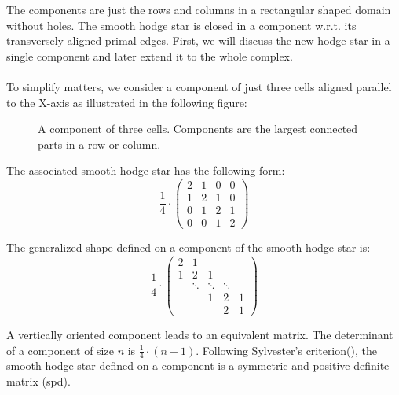 The components are just the rows and columns in a rectangular shaped domain without holes.
The smooth hodge star is closed in a component w.r.t. its transversely aligned primal edges.
First, we will discuss the new hodge star in a single component and later extend it to the whole complex.

\paragraph*{}
To simplify matters, we consider a component of just three cells aligned parallel to the X-axis as illustrated in the following figure:

\begin{figure}[htbp]
	\centering
 	
	\caption[A component of three cells.]{A component of three cells. Components are the largest connected parts in a row or column.}
	\label{fig:RegGridComponent}
\end{figure}	

The associated smooth hodge star has the following form:
\begin{equation}
\frac{1}{4} \cdot
\begin{pmatrix} 2 & 1 & 0 & 0 \\ 1 & 2 & 1 & 0 \\ 0 & 1 & 2 & 1 \\ 0 & 0 & 1 & 2  \end{pmatrix} 
\end{equation}

The generalized shape defined on a component of the smooth hodge star is:
\begin{equation}
\frac{1}{4} \cdot
\begin{pmatrix} 2 & 1 & & & \\ 1 & 2 & 1 & & \\  & \ddots & \ddots & \ddots & \\  &  & 1 & 2 & 1 \\ & & & 2 & 1  \end{pmatrix} 
\end{equation}

A vertically oriented component leads to an equivalent matrix.
The determinant of a component of size $n$ is $\frac{1}{4} \cdot (n+1)$.
Following Sylvester’s criterion(), the smooth hodge-star defined on a component is a symmetric and positive definite matrix (spd).

